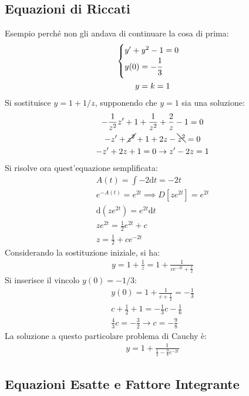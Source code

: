 \documentclass{article}
\newcommand{\df}{\mathrm{d}}
\numberwithin{equation}{subsection}
\begin{document}
\subsection{Equazioni di Riccati}

Esempio perché non gli andava di continuare la cosa di prima:
\begin{gather*}
    \begin{cases}
        y'+y^2-1=0\\
        y(0)=-\displaystyle\frac{\strut 1}{\strut3}
    \end{cases}\\
    y=k=1
\end{gather*}
Si sostituisce $y=1+1/z$, supponendo che $y=1$ sia una soluzione:
\begin{gather*}
    \displaystyle-\frac{1}{z^2}z'+1+\frac{1}{z^2}+\frac{2}{z}-1=0\\
    -z'+\cancel{z^2}+1+2z-\bcancel{z^2}=0\\
    -z'+2z+1=0\to z'-2z=1
\end{gather*}
Si risolve ora quest'equazione semplificata:
\begin{gather*}
    A(t)=\displaystyle\int-2\df t=-2t\\
    e^{-A(t)}=e^{2t}\implies D[ze^{2t}]=e^{2t}\\
    \df(ze^{2t})=e^{2t}\df t\\
    ze^{2t}=\frac{1}{2}e^{2t}+c\\
    z=\frac{1}{2}+ce^{-2t}
\end{gather*}
Considerando la sostituzione iniziale, si ha:
\begin{gather*}
    y=1+\frac{1}{z}=1+\frac{1}{ce^{-2t}+\frac{1}{2}}
\end{gather*}
Si inserisce il vincolo $y(0)=-1/3$:
\begin{gather*}
    y(0)=1+\frac{1}{c+\frac{1}{2}}=-\frac{1}{3}\\
    c+\frac{1}{2}+1=-\frac{1}{3}c-\frac{1}{6}\\
    \frac{4}{3}c=-\frac{3}{2}\to c=-\frac{9}{8}
\end{gather*}
La soluzione a questo particolare problema di Cauchy è:
\begin{gather*}
    y=1+\frac{1}{\frac{1}{2}-\frac{9}{8}e^{-2t}}
\end{gather*}

\subsection{Equazioni Esatte e Fattore Integrante}
\end{document}
